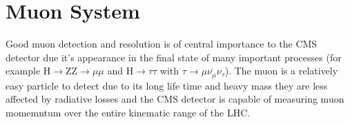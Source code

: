 \section{Muon System}
Good muon detection and resolution is of central importance 
to the CMS detector due it's appearance in the final state of many important processes
(for example H$\rightarrow$ZZ$\rightarrow\mu\mu$ and H$\rightarrow\tau\tau$ 
with $\tau\rightarrow\mu\overbar{\nu_{\mu}}\nu_{\tau}$). 
The muon is a relatively easy particle to detect due to its long life time 
and heavy mass they are less affected by radiative losses and the
CMS detector is capable of measuring muon momemntum over the entire
kinematic range of the LHC. 